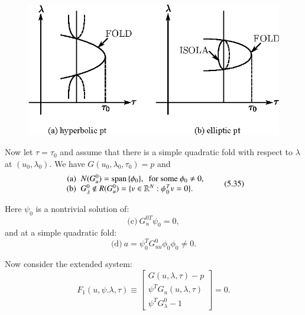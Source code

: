 \begin{figure}[H]
\centering
\includegraphics{vol79-fig/fig79-30.eps}
\smallskip
\caption{}\label{chap5-fig5.6}
\end{figure}

Now let $\tau = \tau_0$ and assume that there is a simple quadratic
fold with respect to $\lambda$ at $(u_0, \lambda_0)$. We have $G(u_0,
\lambda_0, \tau_0)=p$ and 
\begin{equation*}
\begin{array}{r@{\;\;}l}
\text{(a)} & N(G_u^{0})= \text{span\,} 
 \{\phi_0\}, \text{ \ for some\ } \phi_0
\neq 0,\\ 
\text{(b)} & G_{\lambda}^{0} \notin R(G_u^{0})=\{v \in
\mathbb{R}^N :\psi_0^Tv=0 \}. 
\end{array}\tag{5.35}\label{chap5-eq5.35} 
\end{equation*}

Here $\psi_0$ is a nontrivial solution of: 
\begin{equation*}
\text{(c)}~G_u^{0 T}\psi _0=0, \tag{5.35}\label{chap5-eq5.35c}
\end{equation*}\pageoriginale
and at a simple quadratic fold:
\begin{equation*}
\text{(d)}~ a=\psi_0^T G^{0}_{uu} \phi _0 \phi_0 \neq
0. \tag{5.35}\label{chap5-eq5.35d} 
\end{equation*}

Now consider the extended system:
\begin{equation*}
F_1(u, \psi. \lambda, \tau) \equiv 
\begin{bmatrix}
G(u, \lambda , \tau)-p \\ 
\psi ^T G_u(u, \lambda, \tau)\\ 
\psi ^T G_\lambda^{0}-1 
\end{bmatrix}=0.
\end{equation*}

